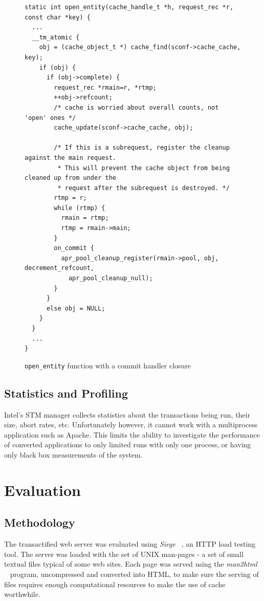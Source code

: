 \documentclass[preprint,natbib,11pt]{sigplanconf}
\begin{document}
\begin{figure}
\begin{lstlisting}
static int open_entity(cache_handle_t *h, request_rec *r, const char *key) {
  ...
  __tm_atomic {
    obj = (cache_object_t *) cache_find(sconf->cache_cache, key);
    if (obj) {
      if (obj->complete) {
        request_rec *rmain=r, *rtmp;
        ++obj->refcount;
        /* cache is worried about overall counts, not 'open' ones */
        cache_update(sconf->cache_cache, obj);

        /* If this is a subrequest, register the cleanup against the main request.
         * This will prevent the cache object from being cleaned up from under the
         * request after the subrequest is destroyed. */
        rtmp = r;
        while (rtmp) {
          rmain = rtmp;
          rtmp = rmain->main;
        }
        on_commit {
          apr_pool_cleanup_register(rmain->pool, obj, decrement_refcount, 
            apr_pool_cleanup_null);
        }
      }
      else obj = NULL;
    }
  }
  ...
}
\end{lstlisting}
\caption{{\tt open\_entity} function with a commit handler closure}
\label{code:closure-open-entity}
\end{figure}

\subsection{Statistics and Profiling}
Intel's STM manager collects statistics about the transactions being run, their
size, abort rates, etc. Unfortunately however, it cannot work with a
multiprocess application such as Apache. This limits the ability to investigate
the performance of converted applications to only limited runs with only one
process, or having only black box measurements of the system.

\section{Evaluation} 
\subsection{Methodology} 
The transactified web server was evaluated using \emph{Siege} ~\cite{siege}, an
HTTP load testing tool. The server was loaded with the set of UNIX man-pages - a
set of small textual files typical of some web sites. Each page was served using
the \emph{man2html} ~\cite{man2html} program, uncompressed and converted into
HTML, to make sure the serving of files requires enough computational resources
to make the use of cache worthwhile.
\end{document}
